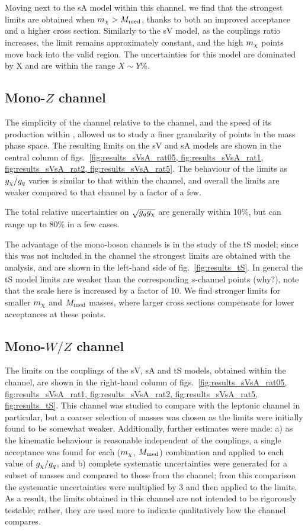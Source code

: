 Moving next to the sA model within this channel, we find that the strongest limits are obtained when $m_{\chi} > M_{\mathrm{med}}$, thanks to both an improved acceptance and a higher cross section. Similarly to the sV model, as the couplings ratio increases, the limit remains approximately constant, and the high $m_{\chi}$ points move back into the valid region. The uncertainties for this model are dominated by X and are within the range $X \sim Y$\%.

\subsection{Mono-$Z$ channel}

The simplicity of the \monoZ channel relative to the \monojet channel, and the speed of its production within \MG, allowed us to study a finer granularity of points in the mass phase space. The resulting limits on the sV and sA models are shown in the central column of figs.~\ref{fig:results_sVsA_rat05, fig:results_sVsA_rat1, fig:results_sVsA_rat2, fig:results_sVsA_rat5}. The behaviour of the limits as $g_{\chi} / g_q$ varies is similar to that within the \monojet channel, and overall the limits are weaker compared to that channel by a factor of a few.

The total relative uncertainties on $\sqrt{g_q g_{\chi}}$ are generally within 10\%, but can range up to 80\% in a few cases.

The advantage of the mono-boson channels is in the study of the tS model; since this was not included in the \monojet channel the strongest limits are obtained with the \monoZ analysis, and are shown in the left-hand side of fig.~\ref{fig:results_tS}. In general the tS model limits are weaker than the corresponding $s$-channel points (why?), note that the scale here is increased by a factor of 10. We find stronger limits for smaller $m_{\chi}$ and $M_{\mathrm{med}}$ masses, where larger cross sections compensate for lower acceptances at these points.

\subsection{Mono-$W/Z$ channel}

The limits on the couplings of the sV, sA and tS models, obtained within the \monoWZ channel, are shown in the right-hand column of figs.~\ref{fig:results_sVsA_rat05, fig:results_sVsA_rat1, fig:results_sVsA_rat2, fig:results_sVsA_rat5, fig:results_tS}. This channel was studied to compare with the leptonic \monoZ channel in particular, but a coarser selection of masses was chosen as the limits were initially found to be somewhat weaker. Additionally, further estimates were made: a) as the kinematic behaviour is reasonable independent of the couplings, a single acceptance was found for each ($m_{\chi}$, $M_{\mathrm{med}}$) combination and applied to each value of $g_{\chi} / g_q$, and b) complete systematic uncertainties were generated for a subset of masses and compared to those from the \monoZ channel; from this comparison the \monoZ systematic uncertainties were multiplied by 3 and then applied to the \monoWZ limits. As a result, the limits obtained in this channel are not intended to be rigorously testable; rather, they are used more to indicate qualitatively how the channel compares.

